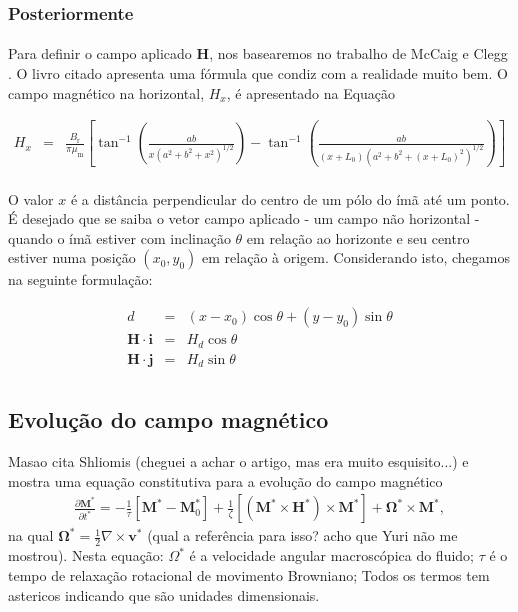 \documentclass[eletromagnetismo.tex]{subfiles}
\begin{document}
\subsubsection{Posteriormente}
\paragraph{} Para definir o campo aplicado $\mathbf{H}$, nos basearemos no trabalho de McCaig e Clegg \cite{mccaig}. O livro citado apresenta uma fórmula que condiz com a realidade muito bem. O campo magnético na horizontal, $H_x$, é apresentado na Equação 

\begin{eqnarray}
H_x &= & \frac{B_{\mathrm{r}}}{\pi \mu_{\mathrm{m}}}\left[\tan^{-1}\left(\frac{ab}{x(a^2+b^2+x^2)^{1/2}}\right) - \tan^{-1}\left(\frac{ab}{(x+L_0)(a^2+b^2+(x+L_0)^2)^{1/2}}\right)\right]
\end{eqnarray}

\paragraph{} O valor $x$ é a distância perpendicular do centro de um pólo do ímã até um ponto. É desejado que se saiba o vetor campo aplicado - um campo não horizontal - quando o ímã estiver com inclinação $\theta$ em relação ao horizonte e seu centro estiver numa posição $(x_0, y_0)$ em relação à origem. Considerando isto, chegamos na seguinte formulação:

\begin{eqnarray}
d &=& (x-x_0)\cos\theta + (y-y_0)\sin\theta\\
\mathbf{H}\cdot \mathbf{i} & = & H_d \cos \theta\\
\mathbf{H}\cdot \mathbf{j} & = & H_d \sin \theta\\
\end{eqnarray}


\subsection{Evolução do campo magnético}

Masao \cite{masao1989} cita Shliomis (cheguei a achar o artigo, mas era muito esquisito...) e mostra uma equação constitutiva para a evolução do campo magnético \begin{eqnarray}
\frac{\partial \mathbf{M}^*}{\partial t^*} = -\frac{1}{\tau}[\mathbf{M}^* - \mathbf{M}_0^*]+\frac{1}{\zeta}[(\mathbf{M}^*\times \mathbf{H}^*)\times\mathbf{M}^*]+\mathbf{\Omega^*}\times \mathbf{M}^*,
\end{eqnarray} na qual $\mathbf{\Omega}^*=\frac{1}{2}\nabla\times \mathbf{v}^*$ (qual a referência para isso? acho que Yuri não me mostrou). Nesta equação: $\Omega^*$ é a velocidade angular macroscópica do fluido; $\tau$ é o tempo de relaxação rotacional de movimento Browniano;  Todos os termos tem astericos indicando que são unidades dimensionais.
\end{document}
